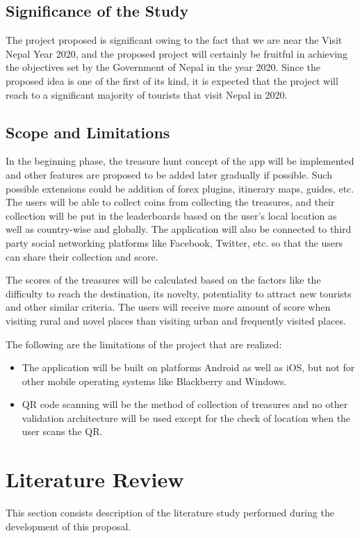\documentclass[12pt, a4paper, oneside]{article}
\begin{document}
\subsection{Significance of the Study}
The project proposed is significant owing to the fact that we are near the Visit Nepal Year 2020, and the proposed project will certainly be fruitful in achieving the objectives set by the Government of Nepal in the year 2020. Since the proposed idea is one of the first of its kind, it is expected that the project will reach to a significant majority of tourists that visit Nepal in 2020.

\subsection{Scope and Limitations}
In the beginning phase, the treasure hunt concept of the app will be implemented and other features are proposed to be added later gradually if possible. Such possible extensions could be addition of forex plugins, itinerary maps, guides, etc. The users will be able to collect coins from collecting the treasures, and their collection will be put in the leaderboards based on the user's local location as well as country-wise and globally. The application will also be connected to third party social networking platforms like Facebook, Twitter, etc. so that the users can share their collection and score. 

The scores of the treasures will be calculated based on the factors like the difficulty to reach the destination, its novelty, potentiality to attract new tourists and other similar criteria. The users will receive more amount of score when visiting rural and novel places than visiting urban and frequently visited places.

The following are the limitations of the project that are realized:
\begin{itemize}
 	\item The application will be built on platforms Android as well as iOS, but not for other mobile operating systems like Blackberry and Windows.
	\item QR code scanning will be the method of collection of treasures and no other validation architecture will be used except for the check of location when the user scans the QR.
 \end{itemize}

\break
\section{Literature Review}
This section consists description of the literature study performed during the development of this proposal.
\end{document}
